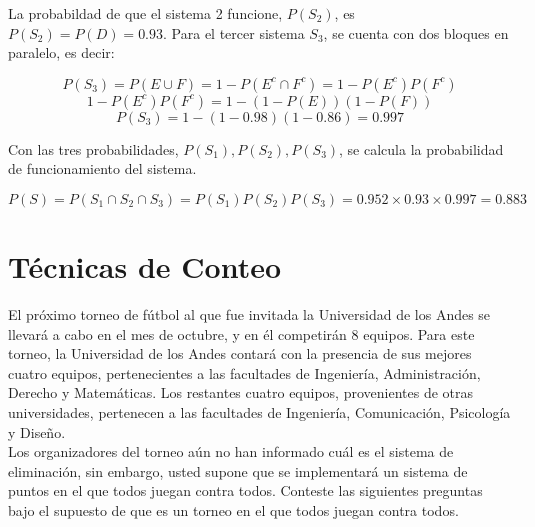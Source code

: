 \documentclass[11pt, spanish]{article}
\begin{document}
\begin{enumerate}[(a)]
La probabildad de que el sistema 2 funcione, $P(S_{2})$, es $P(S_{2}) = P(D) = 0.93$. Para el tercer sistema $S_{3}$, se cuenta con dos bloques en paralelo, es decir:

$$P(S_{3}) = P(E \cup F) = 1 - P(E^c \cap F^c) = 1 - P(E^c)P(F^c)$$
$$1 - P(E^c)P(F^c) = 1 - (1 - P(E))(1 - P(F))$$
$$P(S_{3}) =  1 - (1 - 0.98)(1 - 0.86) = 0.997$$

Con las tres probabilidades, $P(S_1), P(S_2), P(S_3)$, se calcula la probabilidad de funcionamiento del sistema. 

$$P(S) = P(S_1 \cap S_2 \cap S_3) = P(S_1)P(S_2)P(S_3) = 0.952 \times 0.93 \times 0.997 =  0.883$$

\end{enumerate}

\section{Técnicas de Conteo}

El próximo torneo de fútbol al que fue invitada la Universidad de los Andes se llevará a cabo en el mes de octubre, y en él competirán 8 equipos. Para este torneo, la Universidad de los Andes contará con la presencia de sus mejores cuatro equipos, pertenecientes a las facultades de Ingeniería, Administración, Derecho y Matemáticas. Los restantes cuatro equipos, provenientes de otras universidades, pertenecen a las facultades de Ingeniería, Comunicación, Psicología y Diseño.\\

Los organizadores del torneo aún no han informado cuál es el sistema de eliminación, sin embargo, usted supone que se implementará un sistema de puntos en el que todos juegan contra todos. Conteste las siguientes preguntas bajo el supuesto de que es un torneo en el que todos juegan
contra todos.
\end{document}
